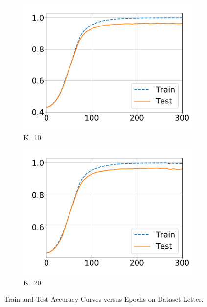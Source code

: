 \begin{figure}[!ht]
\begin{subfigure}{0.31\textwidth}
  \end{subfigure}
  \centering
  \begin{subfigure}{.31\textwidth}
    \centering
    \includegraphics[width=1\linewidth]{images/supply/train_curves/letter_10.pdf}
    \vspace{-0.8cm}
    \caption{K=10}
  \end{subfigure}
  \centering
  \begin{subfigure}{.31\textwidth}
    \centering
    \includegraphics[width=1\linewidth]{images/supply/train_curves/letter_20.pdf}
    \vspace{-0.8cm}
    \caption{K=20}
  \end{subfigure}
  \caption{Train and Test Accuracy Curves versus Epochs on Dataset Letter.}
  \label{fig:class-letter}
\end{figure}




